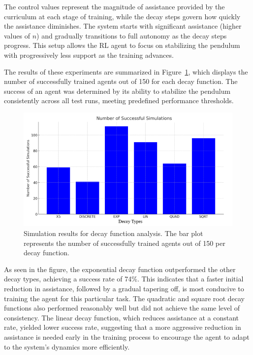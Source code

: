 The control values represent the magnitude of assistance provided by the curriculum at each stage of training, while the decay steps govern how quickly the assistance diminishes. The system starts with significant assistance (higher values of $n$) and gradually transitions to full autonomy as the decay steps progress. This setup allows the RL agent to focus on stabilizing the pendulum with progressively less support as the training advances.

The results of these experiments are summarized in Figure~\ref{fig: decay types comparison}, which displays the number of successfully trained agents out of 150 for each decay function. The success of an agent was determined by its ability to stabilize the pendulum consistently across all test runs, meeting predefined performance thresholds.

\begin{figure}[h]
	\centering
	\includegraphics[width=12cm]{Figures/decay_types_results_comparison.png}
	\caption{Simulation results for decay function analysis. The bar plot represents the number of successfully trained agents out of 150 per decay function.}
	\label{fig: decay types comparison}
\end{figure}

As seen in the figure, the exponential decay function outperformed the other decay types, achieving a success rate of 74\%. This indicates that a faster initial reduction in assistance, followed by a gradual tapering off, is most conducive to training the agent for this particular task. The quadratic and square root decay functions also performed reasonably well but did not achieve the same level of consistency. The linear decay function, which reduces assistance at a constant rate, yielded lower success rate, suggesting that a more aggressive reduction in assistance is needed early in the training process to encourage the agent to adapt to the system’s dynamics more efficiently.

